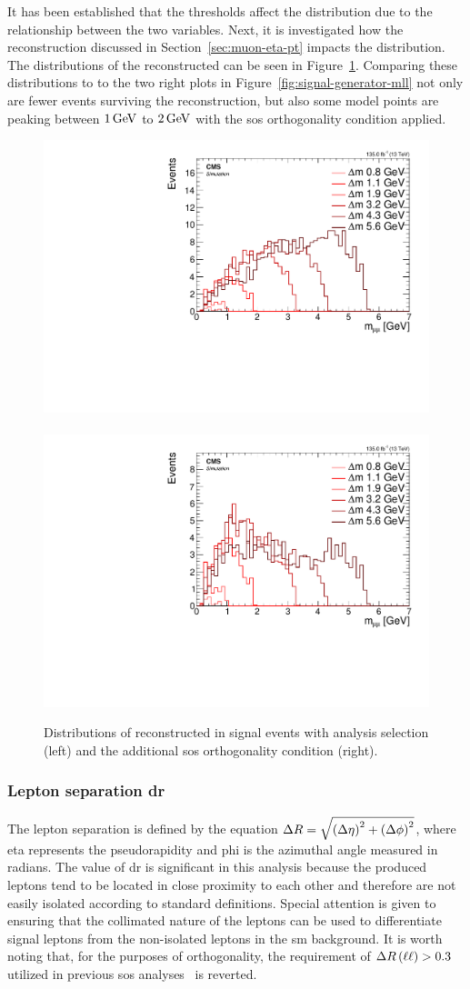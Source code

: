 It has been established that the \pt thresholds affect the \mll distribution due to the relationship between the two variables. Next, it is investigated how the reconstruction discussed in Section~\ref{sec:muon-eta-pt} impacts the \mmumu distribution. The distributions of the reconstructed \mmumu can be seen in Figure~\ref{fig:reco-signal-invamass}. Comparing these distributions to to the two right plots in Figure~\ref{fig:signal-generator-mll} not only are fewer events surviving the reconstruction, but also some \dm model points are peaking between $1 \,\text{Ge\hspace{-.08em}V}$ to $2 \,\text{Ge\hspace{-.08em}V}$ with the \gls{sos} orthogonality condition applied.

\begin{figure}[!htb]
\centering
\includegraphics[width=0.48\linewidth]{plots/signal_muons/none_invMassCorrJetNoMultIso10Dr0.6.pdf} \,
\includegraphics[width=0.48\linewidth]{plots/signal_muons/none_invMassCorrJetNoMultIso10Dr0.6_orth.pdf}  \\
\caption[Distributions of reconstructed \mmumu in signal events]{ Distributions of reconstructed \mmumu in signal events with analysis selection (left) and the additional \gls{sos} orthogonality condition (right).}
\label{fig:reco-signal-invamass}
\end{figure}

\subsubsection{Lepton separation \gls{dr}}
\label{sec:lepton-dr}

The lepton separation is defined by the equation $\Delta R=\sqrt{\left(\Delta\eta\right)^2+\left(\Delta\phi\right)^2}$, where \gls{eta} represents the pseudorapidity and \gls{phi} is the azimuthal angle measured in radians. The value of \gls{dr} is significant in this analysis because the produced leptons tend to be located in close proximity to each other and therefore are not easily isolated according to standard definitions. Special attention is given to ensuring that the collimated nature of the leptons can be used to differentiate signal leptons from the non-isolated leptons in the \gls{sm} background. It is worth noting that, for the purposes of orthogonality, the requirement of $\Delta R\left(\ell\ell\right) > 0.3$ utilized in previous \gls{sos} analyses~\citep{sos} is reverted.

